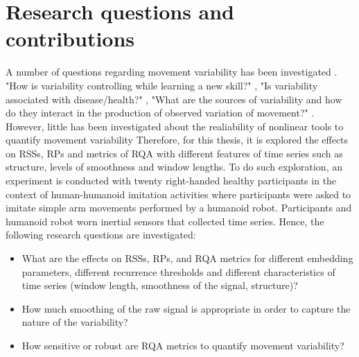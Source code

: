 %









\section{Research questions and contributions}

A number of questions regarding movement variability has been investigated
\cite{stergiou2006, stergiou2011}.
"How is variability controlling while learning a new skill?" \cite{wagner2012, seifert2011, bartlett2007}, 
"Is variability associated with disease/health?" \cite{stergiou2006, stergiou2011},
"What are the sources of variability and how do they interact in the production
of observed variation of movement?" \cite{preatoni2007, preatoni2010, preatoni2013}.
However, little has been investigated about the realiability of 
nonlinear tools to quantify movement variability \cite{iwanski1998, yao2017}
Therefore, for this thesis, it is explored the effects on RSSs, RPs and metrics of RQA
with different features of time series such as structure, 
levels of smoothness and window lengths.
To do such exploration, an experiment is conducted with twenty 
right-handed healthy participants in the context of 
human-humanoid imitation activities where participants 
were asked to imitate simple arm movements performed 
by a humanoid robot. Participants and humanoid robot worn 
inertial sensors that collected time series.
Hence, the following research questions are investigated:


\begin{itemize}

\item What are the effects on RSSs, RPs, and RQA metrics
	for different embedding parameters, different recurrence thresholds 
	and different characteristics of time series (window length, smoothness of the signal, structure)?

\item How much smoothing of the raw signal is appropriate in order to capture the
	nature of the variability?

\item How sensitive or robust are RQA metrics to quantify movement variability?

\end{itemize}







